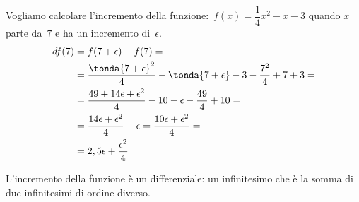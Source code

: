\noindent \begin{minipage}{.48 \textwidth}
\begin{esempio}
Vogliamo calcolare l'incremento della 
funzione:~\(f(x) = \dfrac{1}{4} x^2 -x -3\)
quando \(x\) parte da~\(7\) e ha un incremento di~\(\epsilon\).
\begin{align*}
  df(7) &= f(7+\epsilon) - f(7) = \\
        &= \dfrac{\tonda{7 +\epsilon}^2}{4}  -\tonda{7 +\epsilon} -3 - 
           \dfrac{7^2}{4}  +7 +3 =\\
        &= \dfrac{49 +14 \epsilon +\epsilon^2}{4} -10 -\epsilon - 
           \dfrac{49}{4} +10 =\\
        &= \dfrac{14 \epsilon +\epsilon^2}{4} -\epsilon 
        = \dfrac{10 \epsilon +\epsilon^2}{4} =\\
        &= 2,5 \epsilon + \dfrac{\epsilon^2}{4}
\end{align*}
\end{esempio}
\end{minipage}
 \hfill
\begin{minipage}{.48 \textwidth}
 \begin{center}
\differenziale
 \end{center}
\end{minipage}
L'incremento della funzione è un differenziale: un infinitesimo che è la 
somma di due infinitesimi di ordine diverso. 


